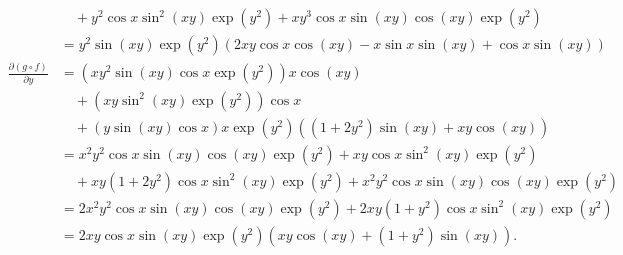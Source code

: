 {\begin{enumerate}
{\begin{align*}
&\quad
+y^2 \cos x \sin^2 (xy) \exp(y^2)
+xy^3 \cos x \sin (xy) \cos(xy)\exp(y^2)
\\&=
y^2 \sin (xy) \exp(y^2)
(
2xy \cos x  \cos (xy) 
-
x \sin x\sin (xy)
+
\cos x \sin (xy)
)
\\
\frac{\partial (g\circ f)}{\partial y}
&=
(xy^2 \sin (xy) \cos x \exp(y^2))
x\cos (xy)
\\
&\quad
+
(xy \sin^2 (xy) \exp(y^2))
\cos x
\\
&\quad
+(y \sin (xy) \cos x)
x\exp(y^2)((1+2y^2)\sin(xy) +xy\cos(xy))
\\
&=
x^2y^2  \cos x\sin (xy) 
\cos (xy)\exp(y^2) +xy \cos x\sin^2 (xy) \exp(y^2)
\\
&\quad
+xy(1+2y^2)  \cos x \sin^2 (xy)
\exp(y^2)
+x^2y^2 \cos x\sin (xy)\cos(xy)\exp(y^2)
\\
&=
2 x^2y^2  \cos x\sin (xy) 
\cos (xy)\exp(y^2) +2xy(1+y^2) \cos x\sin^2 (xy) \exp(y^2)
\\
&=
2xy \cos x   \sin (xy)\exp(y^2)
(xy  \cos (xy) +(1+y^2)  \sin (xy) ) .
\end{align*}}
\end{enumerate}
}
